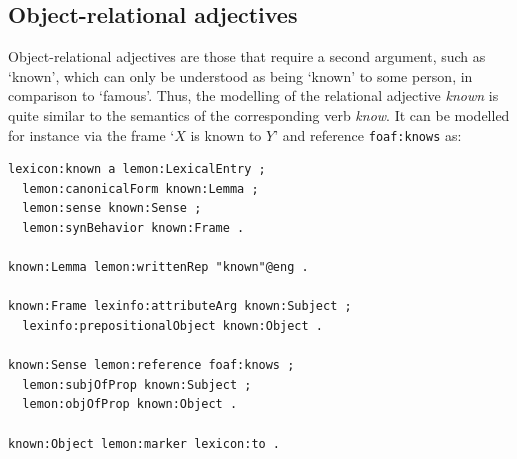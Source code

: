 \documentclass[11pt]{article}
\begin{document}
%
%
%  
%
%
%
%



\subsection{Object-relational adjectives}

Object-relational adjectives are those that require a second argument, such as `known', which
can only be understood as being `known' to some person, in comparison to `famous'.
Thus, the modelling of the relational adjective \emph{known} is quite similar to the semantics of the corresponding verb \emph{know}. It can be modelled for instance via the frame `$X$ is known to $Y$' and
reference {\tt foaf:knows} as:
 
\begin{small}\begin{verbatim}
lexicon:known a lemon:LexicalEntry ;
  lemon:canonicalForm known:Lemma ;
  lemon:sense known:Sense ;
  lemon:synBehavior known:Frame .

known:Lemma lemon:writtenRep "known"@eng .

known:Frame lexinfo:attributeArg known:Subject ;
  lexinfo:prepositionalObject known:Object .

known:Sense lemon:reference foaf:knows ;
  lemon:subjOfProp known:Subject ;
  lemon:objOfProp known:Object .
	
known:Object lemon:marker lexicon:to .
\end{verbatim}\end{small}
\end{document}
